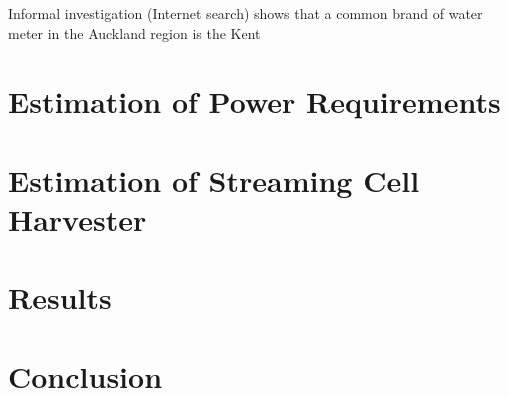 \documentclass[10pt,final,journal]{IEEEtran}
\begin{document}
    Informal investigation (Internet search) shows that a common brand of water meter in the Auckland region is the Kent
    \section{Estimation of Power Requirements}
    \label{sect:powerRequirements}
    \section{Estimation of Streaming Cell Harvester}
    \label{sect:harvesterSize}

    \section{Results}
    \label{sect:results}

    \section{Conclusion}
    
    
\end{document}

